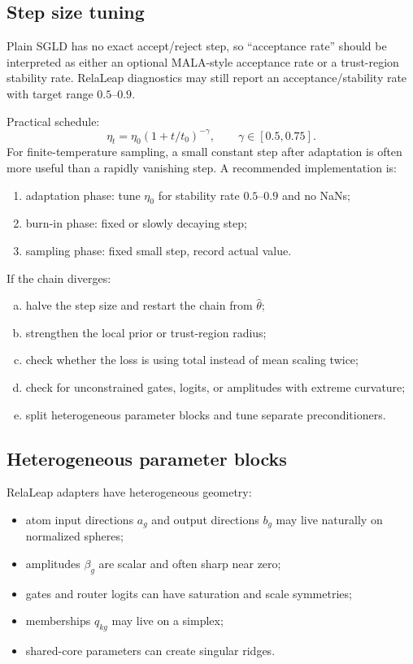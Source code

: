 \documentclass[11pt]{article}
\begin{document}
\subsection{Step size tuning}

Plain SGLD has no exact accept/reject step, so ``acceptance rate'' should be interpreted as either an optional MALA-style acceptance rate or a trust-region stability rate.  RelaLeap diagnostics may still report an acceptance/stability rate with target range $0.5$--$0.9$.

Practical schedule:
\begin{equation}
  \eta_t = \eta_0 (1+t/t_0)^{-\gamma}, \qquad \gamma \in [0.5,0.75].
\end{equation}
For finite-temperature sampling, a small constant step after adaptation is often more useful than a rapidly vanishing step.  A recommended implementation is:
\begin{enumerate}[(1)]
\item adaptation phase: tune $\eta_0$ for stability rate $0.5$--$0.9$ and no NaNs;
\item burn-in phase: fixed or slowly decaying step;
\item sampling phase: fixed small step, record actual value.
\end{enumerate}

If the chain diverges:
\begin{enumerate}[(a)]
\item halve the step size and restart the chain from $\hat\theta$;
\item strengthen the local prior or trust-region radius;
\item check whether the loss is using total instead of mean scaling twice;
\item check for unconstrained gates, logits, or amplitudes with extreme curvature;
\item split heterogeneous parameter blocks and tune separate preconditioners.
\end{enumerate}

\subsection{Heterogeneous parameter blocks}

RelaLeap adapters have heterogeneous geometry:
\begin{itemize}
\item atom input directions $a_g$ and output directions $b_g$ may live naturally on normalized spheres;
\item amplitudes $\beta_g$ are scalar and often sharp near zero;
\item gates and router logits can have saturation and scale symmetries;
\item memberships $q_{kg}$ may live on a simplex;
\item shared-core parameters can create singular ridges.
\end{itemize}
\end{document}
